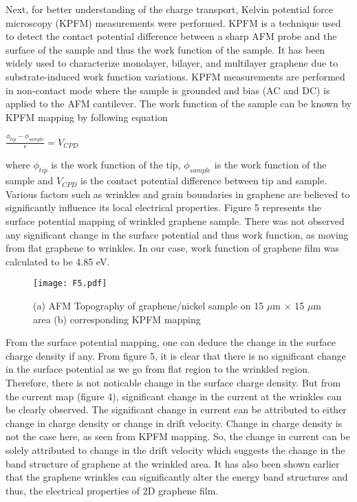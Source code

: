 \documentclass[preprint,aps,preprint,amsmath,amssymb]{revtex4-1}
\begin{document}
Next, for better understanding of the charge transport, Kelvin potential force microscopy (KPFM) measurements were performed. KPFM is a technique used to detect the contact potential difference between a sharp AFM probe and the surface of the sample and thus the work function of the sample. It has been widely used to characterize monolayer, bilayer, and multilayer graphene due to substrate-induced work function variations.\cite{Yoo} KPFM measurements are performed in non-contact mode where the sample is grounded and bias (AC and DC) is applied to the AFM cantilever. The work function of the sample can be known by KPFM mapping by following equation\
\begin{center}
$\frac{\phi_{tip} -  \phi_{sample}}{e} = V_{CPD}$
\end{center}
where $\phi_{tip}$ is the work function of the tip, $\phi_{sample}$ is the work function of the sample and $V_{CPD}$ is the contact potential difference between tip and sample.\cite{Shen} Various factors such as wrinkles and grain boundaries in graphene are believed to significantly influence its local electrical properties. Figure 5 represents the surface potential mapping of wrinkled graphene sample. There was not observed any significant change in the surface potential and thus work function, as moving from flat graphene to wrinkles. In our case, work function of graphene film was calculated to be 4.85 eV. 
\begin{figure}[h!]
	
	\texttt{[image: F5.pdf]}
	\caption {(a) AFM Topography of graphene/nickel sample on 15 $\mu$m × 15 $\mu$m area (b) corresponding KPFM mapping }
	\label{s1}
\end{figure}
From the surface potential mapping, one can deduce the change in the surface charge density if any. From figure 5, it is clear that there is no significant change in the surface potential as we go from flat region to the wrinkled region. Therefore, there is not noticable change in the surface charge density. But from the current map (figure 4), significant change in the current at the wrinkles can be clearly observed. The significant change in current can be attributed to either change in charge density or change in drift velocity. Change in charge density is not the case here, as seen from KPFM mapping. So, the change in current can be solely attributed to change in the drift velocity which suggests the change in the band structure of graphene at the wrinkled area. It has also been shown earlier that the graphene wrinkles can significantly alter the energy band structures and thus, the electrical properties of 2D graphene film.\cite{Deng, Chen}\\
\end{document}
